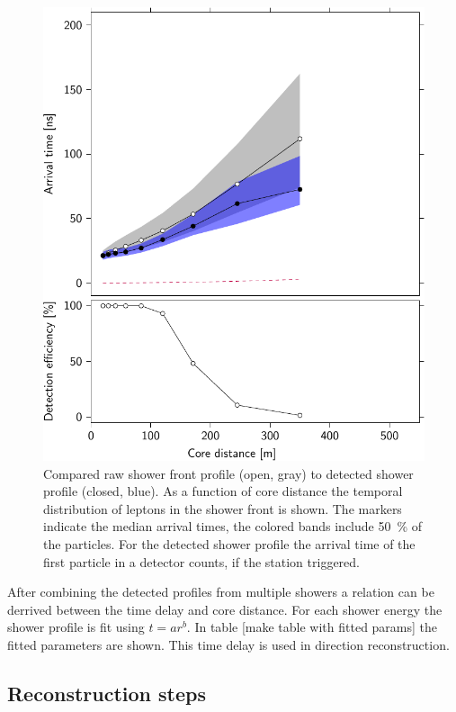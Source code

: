 \begin{figure}
    \centering
    \includegraphics{plots/reconstructions/proton_E_16-0_Z_0-0_I_22_149042664_130233131}
    \caption{Compared raw shower front profile (open, gray) to detected shower profile (closed, blue). As a function of core distance the temporal distribution of leptons in the shower front is shown. The markers indicate the median arrival times, the colored bands include \SI{50}{\percent} of the particles. For the detected shower profile the arrival time of the first particle in a detector counts, if the station triggered.}
    \label{fig:shower_detected_time_profile}
\end{figure}

After combining the detected profiles from multiple showers a relation can be derrived between the time delay and core distance. For each shower energy the shower profile is fit using $t = a r ^ b$. In table [make table with fitted params] the fitted parameters are shown. This time delay is used in direction reconstruction.


\subsection{Reconstruction steps}


